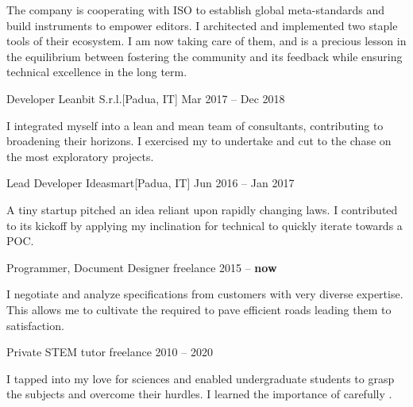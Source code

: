 \documentclass[9pt]{scrartcl}
\def\Phi{1.618}
\newlength{\Pad}\setlength{\Pad}{14.562pt} %
\begin{document}
The company is cooperating with ISO to establish global meta-standards and build
instruments to empower editors. I architected and implemented two staple
 tools of their ecosystem.
%
I am now taking care of them, and  is a precious lesson in
the equilibrium between fostering the community and its feedback while ensuring
technical excellence in the long term.

\smallskip

\Event
  {Developer}
  {Leanbit S.r.l.}[Padua, IT]
  {Mar 2017 -- Dec 2018}

I integrated myself into a lean and mean team of consultants, contributing to
broadening their horizons. I exercised my  to undertake and
cut to the chase on the most exploratory projects.

\smallskip

\Event
  {Lead Developer}
  {Ideasmart}[Padua, IT]
  {Jun 2016 -- Jan 2017}

A tiny startup pitched an idea reliant upon rapidly changing laws.
I contributed to its kickoff by applying my inclination for technical 
to quickly iterate towards a POC.

\smallskip

\Event
  {Programmer, Document Designer}
  {freelance}
  {2015 -- \textbf{now}}

I negotiate and analyze specifications from customers with very diverse
expertise. This allows me to cultivate the  required
to pave efficient roads leading them to satisfaction.

\smallskip

\Event
  {Private STEM tutor}
  {freelance}
  {2010 -- 2020}

I tapped into my love for sciences and enabled undergraduate students to grasp
the subjects and overcome their hurdles. I learned the importance of carefully
.


\end{document}
